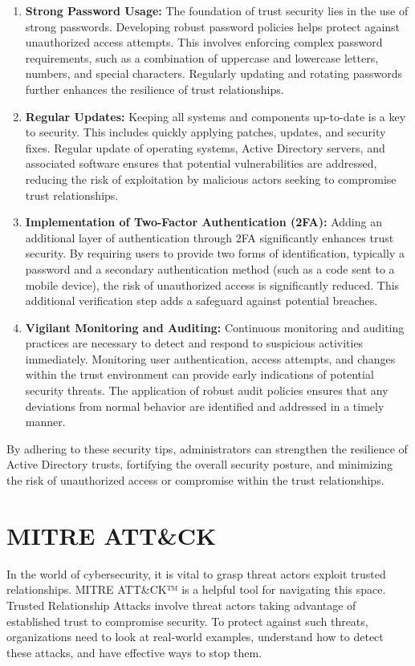 \begin{enumerate}
    \item \textbf{Strong Password Usage:} The foundation of trust security lies in the use of strong passwords. Developing robust password policies helps protect against unauthorized access attempts. This involves enforcing complex password requirements, such as a combination of uppercase and lowercase letters, numbers, and special characters. Regularly updating and rotating passwords further enhances the resilience of trust relationships.
    \item \textbf{Regular Updates:} Keeping all systems and components up-to-date is a key to security. This includes quickly applying patches, updates, and security fixes. Regular update of operating systems, Active Directory servers, and associated software ensures that potential vulnerabilities are addressed, reducing the risk of exploitation by malicious actors seeking to compromise trust relationships.
    \item \textbf{Implementation of Two-Factor Authentication (2FA}\textbf{):} Adding an additional layer of authentication through 2FA significantly enhances trust security. By requiring users to provide two forms of identification, typically a password and a secondary authentication method (such as a code sent to a mobile device), the risk of unauthorized access is significantly reduced. This additional verification step adds a safeguard against potential breaches.
    \item \textbf{Vigilant Monitoring and Auditing:} Continuous monitoring and auditing practices are necessary to detect and respond to suspicious activities immediately. Monitoring user authentication, access attempts, and changes within the trust environment can provide early indications of potential security threats. The application of robust audit policies ensures that any deviations from normal behavior are identified and addressed in a timely manner.
\end{enumerate}
By adhering to these security tips, administrators can strengthen the resilience of Active Directory trusts, fortifying the overall security posture, and minimizing the risk of unauthorized access or compromise within the trust relationships.

\section{MITRE ATT\&CK} 
In the world of cybersecurity, it is vital to grasp threat actors exploit trusted relationships. MITRE ATT\&CK™ is a helpful tool for navigating this space. Trusted Relationship Attacks involve threat actors taking advantage of established trust to compromise security. To protect against such threats, organizations need to look at real-world examples, understand how to detect these attacks, and have effective ways to stop them.

